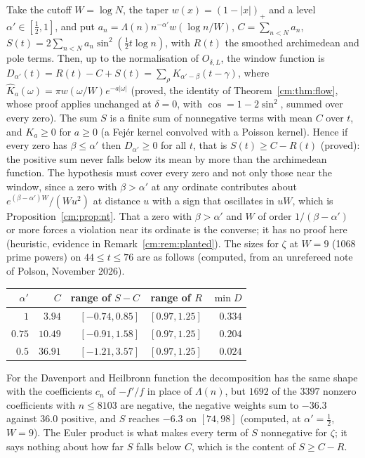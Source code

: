 \begin{remark}\label{cm:rem:band}
Take the cutoff $W=\log N$, the taper $w(x)=(1-|x|)_+$ and a level $\alpha'\in[\frac12,1]$, and put $a_n=\Lambda(n)n^{-\alpha'}w(\log n/W)$, $C=\sum_{n<N}a_n$, $S(t)=2\sum_{n<N}a_n\sin^2(\frac12t\log n)$, with $R(t)$ the smoothed archimedean and pole terms. Then, up to the normalisation of $O_{\delta,L}$, the window function is $D_{\alpha'}(t)=R(t)-C+S(t)=\sum_\rho K_{\alpha'-\beta}(t-\gamma)$, where $\hat K_a(\omega)=\pi w(\omega/W)e^{-a|\omega|}$ (proved, the identity of Theorem~\ref{cm:thm:flow}, whose proof applies unchanged at $\delta=0$, with $\cos=1-2\sin^2$, summed over every zero). The sum $S$ is a finite sum of nonnegative terms with mean $C$ over $t$, and $K_a\ge0$ for $a\ge0$ (a Fej\'er kernel convolved with a Poisson kernel). Hence if every zero has $\beta\le\alpha'$ then $D_{\alpha'}\ge0$ for all $t$, that is $S(t)\ge C-R(t)$ (proved): the positive sum never falls below its mean by more than the archimedean function. The hypothesis must cover every zero and not only those near the window, since a zero with $\beta>\alpha'$ at any ordinate contributes about $e^{(\beta-\alpha')W}/(Wu^2)$ at distance $u$ with a sign that oscillates in $uW$, which is Proposition~\ref{cm:prop:nt}. That a zero with $\beta>\alpha'$ and $W$ of order $1/(\beta-\alpha')$ or more forces a violation near its ordinate is the converse; it has no proof here (heuristic, evidence in Remark~\ref{cm:rem:planted}). The sizes for $\zeta$ at $W=9$ (1068 prime powers) on $44\le t\le76$ are as follows (computed, from an unrefereed note of Polson, November 2026).
\begin{center}\small
\begin{tabular}{rrrrr}
$\alpha'$ & $C$ & range of $S-C$ & range of $R$ & $\min D$ \\
\hline
$1$ & $3.94$ & $[-0.74,0.85]$ & $[0.97,1.25]$ & $0.334$ \\
$0.75$ & $10.49$ & $[-0.91,1.58]$ & $[0.97,1.25]$ & $0.204$ \\
$0.5$ & $36.91$ & $[-1.21,3.57]$ & $[0.97,1.25]$ & $0.024$ \\
\end{tabular}
\end{center}
For the Davenport and Heilbronn function \cite{DH36} the decomposition has the same shape with the coefficients $c_n$ of $-f'/f$ in place of $\Lambda(n)$, but $1692$ of the $3397$ nonzero coefficients with $n\le8103$ are negative, the negative weights sum to $-36.3$ against $36.0$ positive, and $S$ reaches $-6.3$ on $[74,98]$ (computed, at $\alpha'=\frac12$, $W=9$). The Euler product is what makes every term of $S$ nonnegative for $\zeta$; it says nothing about how far $S$ falls below $C$, which is the content of $S\ge C-R$.
\end{remark}

